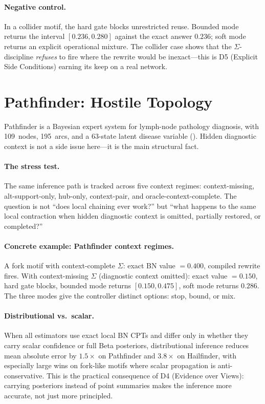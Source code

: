 \documentclass[11pt,openany]{report}
\begin{document}
\paragraph{Negative control.}
In a collider motif, the hard gate blocks unrestricted reuse.
Bounded mode returns the interval $[0.236, 0.280]$ against the
exact answer $0.236$; soft mode returns an explicit operational
mixture.  The collider case shows that the $\Sigma$-discipline
\emph{refuses} to fire where the rewrite would be inexact---this
is D5 (Explicit Side Conditions) earning its keep on a real
network.


\section{Pathfinder: Hostile Topology}

Pathfinder is a Bayesian expert system for lymph-node pathology
diagnosis, with 109~nodes, 195~arcs, and a 63-state latent
disease variable ().  Hidden diagnostic context is
not a side issue here---it is the main structural fact.

\paragraph{The stress test.}
The same inference path is tracked across five context regimes:
context-missing, alt-support-only, hub-only, context-pair, and
oracle-context-complete.  The question is not ``does local
chaining ever work?'' but ``what happens to the same local
contraction when hidden diagnostic context is omitted, partially
restored, or completed?''

\paragraph{Concrete example: Pathfinder context regimes.}
A fork motif with context-complete $\Sigma$: exact BN value
$= 0.400$, compiled rewrite fires.  With context-missing
$\Sigma$ (diagnostic context omitted): exact value $= 0.150$,
hard gate blocks, bounded mode returns $[0.150, 0.475]$,
soft mode returns $0.286$.  The three modes give the controller
distinct options: stop, bound, or mix.

\paragraph{Distributional vs.\ scalar.}
When all estimators use exact local BN CPTs and differ only in
whether they carry scalar confidence or full Beta posteriors,
distributional inference reduces mean absolute error by
$1.5\times$ on Pathfinder and $3.8\times$ on Hailfinder, with
especially large wins on fork-like motifs where scalar
propagation is anti-conservative.  This is the practical
consequence of D4 (Evidence over Views): carrying posteriors
instead of point summaries makes the inference more accurate,
not just more principled.
\end{document}
